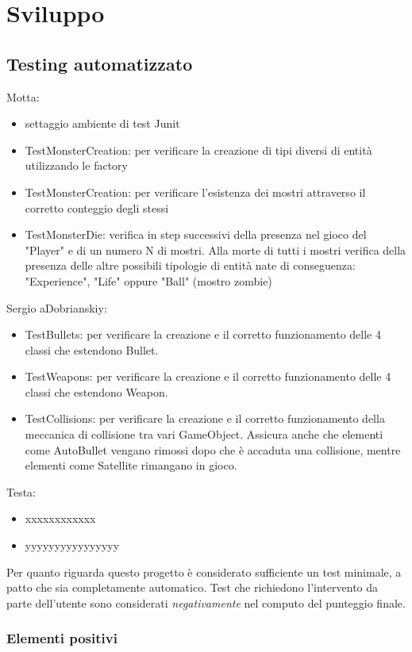 \documentclass[a4paper,12pt]{report}
\begin{document}
\chapter{Sviluppo}
\section{Testing automatizzato}

Motta:
\begin{itemize}
	\item settaggio ambiente di test Junit
	\item TestMonsterCreation: per verificare la creazione di tipi diversi di entità utilizzando le factory
	\item TestMonsterCreation: per verificare l'esistenza dei mostri attraverso il corretto conteggio degli stessi
	\item TestMonsterDie: verifica in step successivi della presenza nel gioco del "Player" e di un numero N di mostri. Alla morte di tutti i mostri verifica della presenza delle altre possibili tipologie di entità nate di conseguenza: "Experience", "Life" oppure "Ball" (mostro zombie)
\end{itemize}
%
Sergio aDobrianskiy:
\begin{itemize}
	\item TestBullets: per verificare la creazione e il corretto funzionamento delle 4 classi che estendono Bullet.
	\item TestWeapons: per verificare la creazione e il corretto funzionamento delle 4 classi che estendono Weapon.
	\item TestCollisions: per verificare la creazione e il corretto funzionamento della meccanica di collisione tra vari GameObject. Assicura anche che elementi come AutoBullet vengano rimossi dopo che è accaduta una collisione, mentre elementi come Satellite rimangano in gioco.
\end{itemize}
%
Testa:
\begin{itemize}
	\item xxxxxxxxxxxx
	\item yyyyyyyyyyyyyyyy
\end{itemize}
	
Per quanto riguarda questo progetto è considerato sufficiente un test minimale, a patto che sia completamente automatico.
%
Test che richiedono l'intervento da parte dell'utente sono considerati \textit{negativamente} nel computo del punteggio finale.

\subsection*{Elementi positivi}
\end{document}
